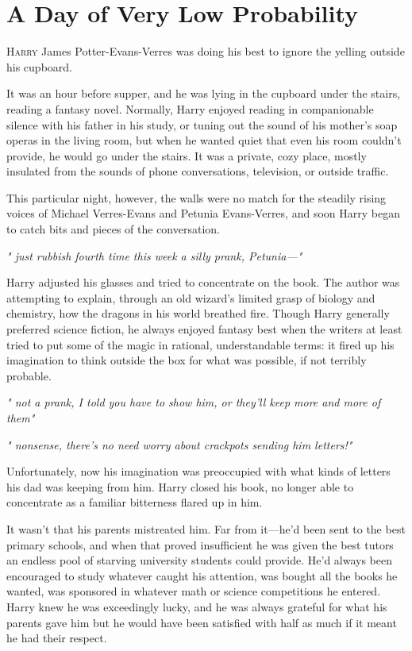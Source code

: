 
\chapter{A Day of Very Low Probability}

\lettrine{H}{arry} James Potter-Evans-Verres was doing his best to
ignore the yelling outside his cupboard.

It was an hour before supper, and he was lying in the
cupboard under the stairs, reading a fantasy novel.
Normally, Harry enjoyed reading in companionable silence with
his father in his study, or tuning out the sound of his
mother's soap operas in the living room, but when he
wanted quiet that even his room couldn't provide, he
would go under the stairs. It was a private, cozy place,
mostly insulated from the sounds of phone conversations,
television, or outside traffic.

This particular night, however, the walls were no match for
the steadily rising voices of Michael Verres-Evans and Petunia
Evans-Verres, and soon Harry began to catch bits and
pieces of the conversation.

\emph{"{\el} just rubbish{\el} fourth time this week{\el} a silly prank,
Petunia—"}

Harry adjusted his glasses and tried to concentrate on the
book. The author was attempting to explain, through an
old wizard's limited grasp of biology and chemistry, how
the dragons in his world breathed fire. Though Harry
generally preferred science fiction, he always enjoyed
fantasy best when the writers at least tried to put some
of the magic in rational, understandable terms: it fired up
his imagination to think outside the box for what was
possible, if not terribly probable.

\emph{"{\el} not a prank, I told you{\el} have to show him, or they'll
keep{\el} more and more of them{\el}"}

\emph{"{\el} nonsense, there's no need{\el} worry about crackpots
sending him letters!"}

Unfortunately, now his imagination was preoccupied with
what kinds of letters his dad was keeping from him. Harry
closed his book, no longer able to concentrate as a familiar
bitterness flared up in him.

It wasn't that his parents mistreated him. Far from it—he'd
been sent to the best primary schools, and when that
proved insufficient he was given the best tutors an endless
pool of starving university students could provide. He'd
always been encouraged to study whatever caught his
attention, was bought all the books he wanted, was
sponsored in whatever math or science competitions he
entered. Harry knew he was exceedingly lucky, and he was
always grateful for what his parents gave him{\el} but he
would have been satisfied with half as much if it meant he
had their respect.

